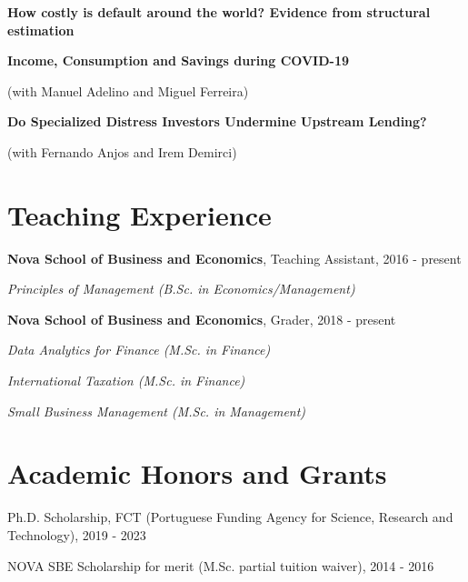 \documentclass[letterpaper]{article}
\renewenvironment{itemize}{
  \begin{list}{}{
    \setlength{\leftmargin}{1.5em}
  }
}{
  \end{list}
}
\begin{document}
\begin{itemize}
\item \textbf{How costly is default around the world? Evidence from structural estimation}

\medskip

\item \textbf{Income, Consumption and Savings during COVID-19}

	(with Manuel Adelino and Miguel Ferreira)
\medskip
	
\item \textbf{Do Specialized Distress Investors Undermine Upstream Lending?}

	(with Fernando Anjos and Irem Demirci)

\end{itemize}

\section*{Teaching Experience}

\begin{itemize} 
\item \textbf{Nova School of Business and Economics}, Teaching Assistant, 2016 - present
\begin{itemize}
\item \textit{Principles of Management (B.Sc. in Economics/Management)}
\smallskip
\end{itemize}
\item \textbf{Nova School of Business and Economics}, Grader, 2018 - present
\begin{itemize}
\item \textit{Data Analytics for Finance (M.Sc. in Finance)}
\item \textit{International Taxation (M.Sc. in Finance)}
\item \textit{Small Business Management (M.Sc. in Management)}
\end{itemize}
\end{itemize}

\section*{Academic Honors and Grants}

\begin{itemize}
\item Ph.D. Scholarship, FCT (Portuguese Funding Agency for Science, Research and Technology), 2019 - 2023
\item NOVA SBE Scholarship for merit (M.Sc. partial tuition waiver), 2014 - 2016
\end{itemize}
\end{document}
